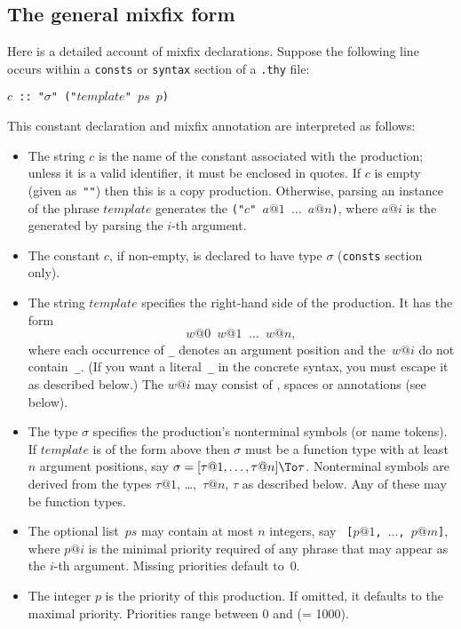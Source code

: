 \subsection{The general mixfix form}
Here is a detailed account of mixfix declarations.  Suppose the following
line occurs within a {\tt consts} or {\tt syntax} section of a {\tt .thy}
file:
\begin{center}
  {\tt $c$ ::\ "$\sigma$" ("$template$" $ps$ $p$)}
\end{center}
This constant declaration and mixfix annotation are interpreted as follows:
\begin{itemize}
\item The string {\tt $c$} is the name of the constant associated with the
  production; unless it is a valid identifier, it must be enclosed in
  quotes.  If $c$ is empty (given as~{\tt ""}) then this is a copy
  production. Otherwise, parsing an instance of the
  phrase $template$ generates the \AST{} {\tt ("$c$" $a@1$ $\ldots$
    $a@n$)}, where $a@i$ is the \AST{} generated by parsing the $i$-th
  argument.

  \item The constant $c$, if non-empty, is declared to have type $\sigma$
    ({\tt consts} section only).

  \item The string $template$ specifies the right-hand side of
    the production.  It has the form
    \[ w@0 \;_\; w@1 \;_\; \ldots \;_\; w@n, \]
    where each occurrence of {\tt_} denotes an argument position and
    the~$w@i$ do not contain~{\tt _}.  (If you want a literal~{\tt _} in
    the concrete syntax, you must escape it as described below.)  The $w@i$
    may consist of , spaces or
     annotations (see below).

  \item The type $\sigma$ specifies the production's nonterminal symbols
    (or name tokens).  If $template$ is of the form above then $\sigma$
    must be a function type with at least~$n$ argument positions, say
    $\sigma = [\tau@1, \dots, \tau@n] \To \tau$.  Nonterminal symbols are
    derived from the types $\tau@1$, \ldots,~$\tau@n$, $\tau$ as described
    below.  Any of these may be function types.

  \item The optional list~$ps$ may contain at most $n$ integers, say {\tt
      [$p@1$, $\ldots$, $p@m$]}, where $p@i$ is the minimal
    priority required of any phrase that may appear
    as the $i$-th argument.  Missing priorities default to~0.

  \item The integer $p$ is the priority of this production.  If omitted, it
    defaults to the maximal priority.
    Priorities range between 0 and  (= 1000).
\end{itemize}
